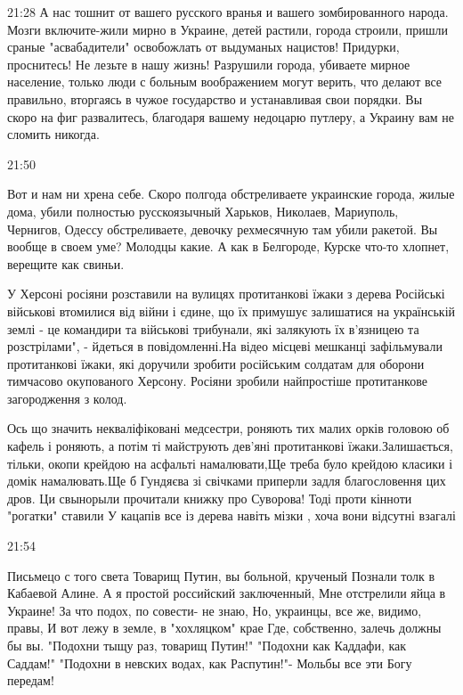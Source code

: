 {%
21:28
А нас тошнит от вашего русского вранья и вашего зомбированного народа. Мозги включите-жили мирно в Украине, детей растили, города строили, пришли сраные "асвабадители" освобожлать от выдуманых нацистов! Придурки, проснитесь! Не лезьте в нашу жизнь! Разрушили города, убиваете мирное население, только люди с больным воображением могут верить, что делают все правильно, вторгаясь в чужое государство и устанавливая свои порядки. Вы скоро на фиг развалитесь, благодаря вашему недоцарю путлеру, а Украину вам не сломить никогда.

21:50

Вот и нам ни хрена себе. Скоро полгода обстреливаете украинские города, жилые
дома, убили полностью русскоязычный Харьков, Николаев, Мариуполь, Чернигов,
Одессу обстреливаете, девочку рехмесячную там убили ракетой. Вы вообще в своем
уме? Молодцы какие. А как в Белгороде, Курске что-то хлопнет, верещите как
свиньи.


У Херсоні росіяни розставили на вулицях протитанкові їжаки з дерева Російські
військові втомилися від війни і єдине, що їх примушує залишатися на українській
землі - це командири та військові трибунали, які залякують їх в’язницею та
розстрілами", - йдеться в повідомленні.На відео місцеві мешканці зафільмували
протитанкові їжаки, які доручили зробити російським солдатам для оборони
тимчасово окупованого Херсону. Росіяни зробили найпростіше протитанкове
загородження з колод.

Ось що значить некваліфіковані медсестри, роняють тих малих орків головою об
кафель і роняють, а потім ті майструють дев'яні протитанкові їжаки.Залишається,
тільки, окопи крейдою на асфальті намалювати,Ще треба було крейдою класики і
домік намалювать.Ще б Гундяєва зі свічками приперли задля благословення цих
дров. Ци свынорыли прочитали книжку про Суворова! Тоді проти кінноти "рогатки"
ставили У кацапів все із дерева навіть мізки , хоча вони відсутні взагалі

21:54

Письмецо с того света
Товарищ Путин, вы больной, крученый
Познали толк в Кабаевой Алине.
А я простой российский заключенный,
Мне отстрелили яйца в Украине!
За что подох, по совести- не знаю,
Но, украинцы, все же, видимо, правы,
И вот лежу в земле, в "хохляцком" крае
Где, собственно, залечь должны бы вы.
"Подохни тыщу раз, товарищ Путин!"
"Подохни как Каддафи, как Саддам!"
"Подохни в невских водах, как Распутин!"-
Мольбы все эти Богу передам!

}
